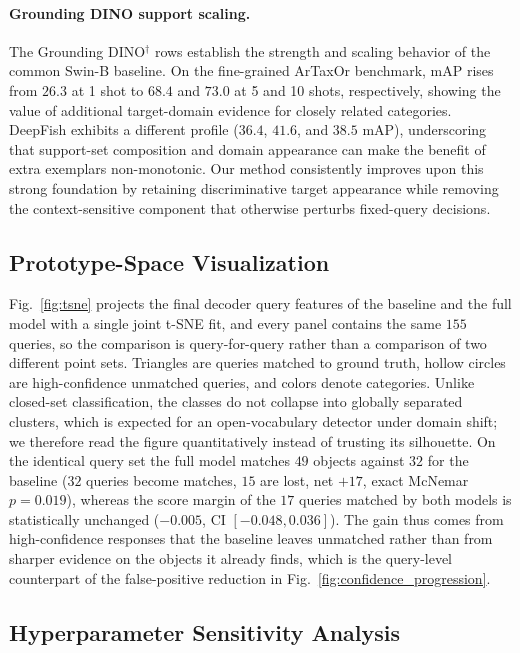 \paragraph{Grounding DINO support scaling.}
The Grounding DINO$^\dagger$ rows establish the strength and scaling behavior of the common Swin-B baseline. On the fine-grained ArTaxOr benchmark, mAP rises from $26.3$ at 1 shot to $68.4$ and $73.0$ at 5 and 10 shots, respectively, showing the value of additional target-domain evidence for closely related categories. DeepFish exhibits a different profile ($36.4$, $41.6$, and $38.5$ mAP), underscoring that support-set composition and domain appearance can make the benefit of extra exemplars non-monotonic. Our method consistently improves upon this strong foundation by retaining discriminative target appearance while removing the context-sensitive component that otherwise perturbs fixed-query decisions.

\subsection{Prototype-Space Visualization}
\label{sec:tsne}



Fig.~\ref{fig:tsne} projects the final decoder query features of the baseline
and the full model with a single joint t-SNE fit, and every panel contains the
same $155$ queries, so the comparison is query-for-query rather than a
comparison of two different point sets. Triangles are queries matched to ground
truth, hollow circles are high-confidence unmatched queries, and colors denote
categories. Unlike closed-set classification, the classes do not collapse into
globally separated clusters, which is expected for an open-vocabulary detector
under domain shift; we therefore read the figure quantitatively instead of
trusting its silhouette. On the identical query set the full model matches $49$
objects against $32$ for the baseline ($32$ queries become matches, $15$ are
lost, net $+17$, exact McNemar $p=0.019$), whereas the score margin of the $17$
queries matched by both models is statistically unchanged
($-0.005$, CI $[-0.048,0.036]$). The gain thus comes from high-confidence
responses that the baseline leaves unmatched rather than from sharper evidence
on the objects it already finds, which is the query-level counterpart of the
false-positive reduction in Fig.~\ref{fig:confidence_progression}.

\subsection{Hyperparameter Sensitivity Analysis}
\label{sec:exp_sensitivity}

